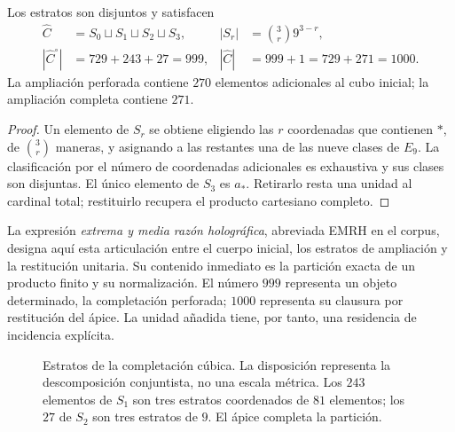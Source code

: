 \begin{proposition}
Los estratos son disjuntos y satisfacen
\begin{align}
 \widehat C&=S_0\sqcup S_1\sqcup S_2\sqcup S_3,
 &|S_r|&=\binom3r9^{3-r},\label{vi:cubo:estratos}\\
 |\widehat C^{\circ}|&=729+243+27=999,
 &|\widehat C|&=999+1=729+271=1000.\label{vi:cubo:999}
\end{align}
La ampliación perforada contiene \(270\) elementos adicionales al cubo
inicial; la ampliación completa contiene \(271\).
\end{proposition}
\begin{proof}
Un elemento de \(S_r\) se obtiene eligiendo las \(r\) coordenadas que
contienen \(\ast\), de \(\binom3r\) maneras, y asignando a las restantes
una de las nueve clases de \(E_9\). La clasificación por el número de
coordenadas adicionales es exhaustiva y sus clases son disjuntas. El único
elemento de \(S_3\) es \(a_\ast\). Retirarlo resta una unidad al cardinal
total; restituirlo recupera el producto cartesiano completo.
\end{proof}

La expresión \emph{extrema y media razón holográfica}, abreviada EMRH en
el corpus, designa aquí esta articulación entre el cuerpo inicial, los
estratos de ampliación y la restitución unitaria. Su contenido inmediato
es la partición exacta de un producto finito y su normalización. El número
\(999\) representa un objeto determinado, la completación perforada;
\(1000\) representa su clausura por restitución del ápice. La unidad
añadida tiene, por tanto, una residencia de incidencia explícita.

\begin{figure}[htbp]
\centering
{}
\caption{Estratos de la completación cúbica. La disposición representa
la descomposición conjuntista, no una escala métrica. Los \(243\) elementos
de \(S_1\) son tres estratos coordenados de \(81\) elementos; los \(27\)
de \(S_2\) son tres estratos de \(9\). El ápice completa la partición.}
\label{vi:cubo:estratos-fig}
\end{figure}

